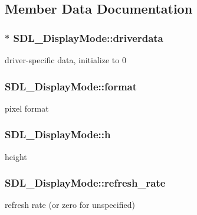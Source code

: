 \subsection{Member Data Documentation}
\hypertarget{structSDL__DisplayMode_a411f93025411da873f37a384ae62bbcf}{}
\subsubsection[{driverdata}]{$\ast$ S\+D\+L\+\_\+\+Display\+Mode\+::driverdata}\label{structSDL__DisplayMode_a411f93025411da873f37a384ae62bbcf}
driver-\/specific data, initialize to 0 \hypertarget{structSDL__DisplayMode_ae8120e0a18a99992f039756e1b503680}{}
\subsubsection[{format}]{ S\+D\+L\+\_\+\+Display\+Mode\+::format}\label{structSDL__DisplayMode_ae8120e0a18a99992f039756e1b503680}
pixel format \hypertarget{structSDL__DisplayMode_a0d9eabed50a560ed553af772c26632d7}{}
\subsubsection[{h}]{ S\+D\+L\+\_\+\+Display\+Mode\+::h}\label{structSDL__DisplayMode_a0d9eabed50a560ed553af772c26632d7}
height \hypertarget{structSDL__DisplayMode_ad1b5783c9b292ebf24ad4e0e7a98e540}{}
\subsubsection[{refresh\+\_\+rate}]{ S\+D\+L\+\_\+\+Display\+Mode\+::refresh\+\_\+rate}\label{structSDL__DisplayMode_ad1b5783c9b292ebf24ad4e0e7a98e540}
refresh rate (or zero for unspecified) \hypertarget{structSDL__DisplayMode_a504bb5e21950b719a0df43be51199046}{}
